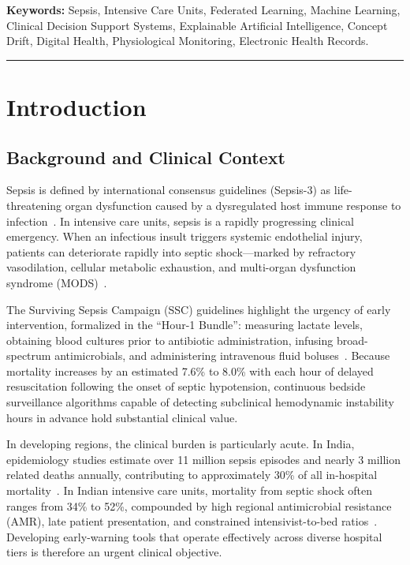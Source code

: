 \documentclass[11pt,a4paper]{article}
\begin{document}
\vspace{0.5em}
\noindent \textbf{Keywords:} Sepsis, Intensive Care Units, Federated Learning, Machine Learning, Clinical Decision Support Systems, Explainable Artificial Intelligence, Concept Drift, Digital Health, Physiological Monitoring, Electronic Health Records.

\vspace{1em}
\hrule
\vspace{1.5em}

\section{Introduction}

\subsection{Background and Clinical Context}
Sepsis is defined by international consensus guidelines (Sepsis-3) as life-threatening organ dysfunction caused by a dysregulated host immune response to infection~\cite{singer2016sepsis3}. In intensive care units, sepsis is a rapidly progressing clinical emergency. When an infectious insult triggers systemic endothelial injury, patients can deteriorate rapidly into septic shock---marked by refractory vasodilation, cellular metabolic exhaustion, and multi-organ dysfunction syndrome (MODS)~\cite{singer2016sepsis3,evans2021surviving}.

The Surviving Sepsis Campaign (SSC) guidelines highlight the urgency of early intervention, formalized in the ``Hour-1 Bundle'': measuring lactate levels, obtaining blood cultures prior to antibiotic administration, infusing broad-spectrum antimicrobials, and administering intravenous fluid boluses~\cite{evans2021surviving}. Because mortality increases by an estimated 7.6\% to 8.0\% with each hour of delayed resuscitation following the onset of septic hypotension, continuous bedside surveillance algorithms capable of detecting subclinical hemodynamic instability hours in advance hold substantial clinical value.

In developing regions, the clinical burden is particularly acute. In India, epidemiology studies estimate over 11 million sepsis episodes and nearly 3 million related deaths annually, contributing to approximately 30\% of all in-hospital mortality~\cite{rudd2020global,chatterjee2020india,kalakoti2025fedxai}. In Indian intensive care units, mortality from septic shock often ranges from 34\% to 52\%, compounded by high regional antimicrobial resistance (AMR), late patient presentation, and constrained intensivist-to-bed ratios~\cite{chatterjee2020india}. Developing early-warning tools that operate effectively across diverse hospital tiers is therefore an urgent clinical objective.
\end{document}
